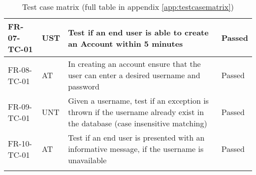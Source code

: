 \documentclass[../report.tex]{subfiles}
\begin{document}
\begin{longtable}{|L{2.1cm}|L{0.8cm}|L{9cm}|L{1.2cm}|}
FR-07-TC-01&UST&Test if an end user is able to create an Account within 5 minutes&Passed  \\ \hline
FR-08-TC-01&AT&In creating an account ensure that the user can enter a desired username and password&Passed  \\ \hline
FR-09-TC-01&UNT&Given a username, test if an exception is thrown if the username already exist in the database (case insensitive matching)&Passed  \\ \hline
FR-10-TC-01&AT&Test if an end user is presented with an informative message, if the username is unavailable&Passed  \\ \hline

\captionsetup{belowskip=10pt}

\caption{\label{tab:testcasematrix} Test case matrix (full table in appendix \ref{app:testcasematrix})}

\end{longtable}
\end{document}
